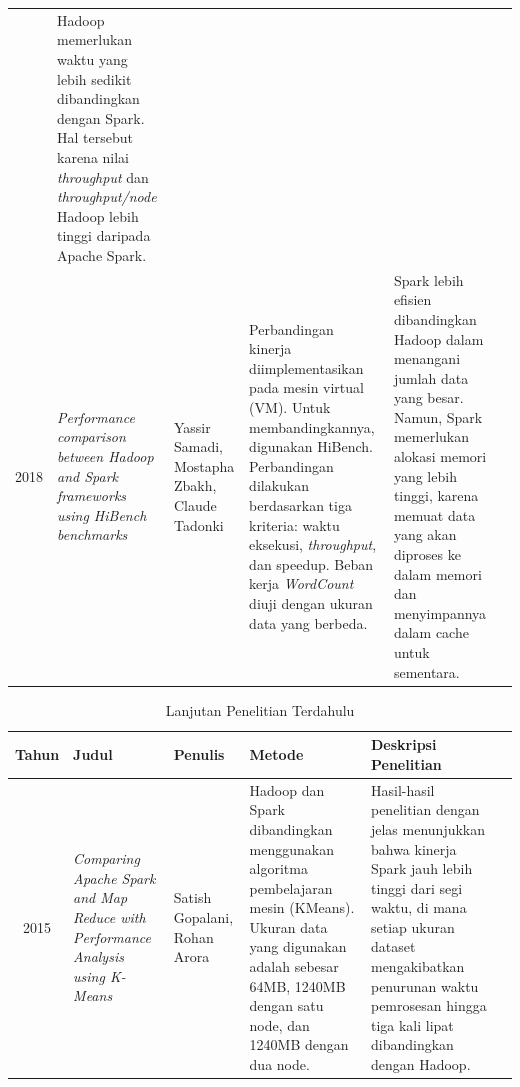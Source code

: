 \begin{table}[h]
\begin{tabularx}{\textwidth}{c*{5}{>{\raggedright\arraybackslash}X}}
  & Hadoop memerlukan waktu yang lebih sedikit dibandingkan dengan Spark. Hal tersebut karena nilai \textit{throughput} dan \textit{throughput/node} Hadoop lebih tinggi daripada Apache Spark. \\
2018 & \textit{Performance comparison between Hadoop and Spark frameworks using HiBench benchmarks \cite{samadiPerformanceComparisonHadoop2018}} 
  & Yassir Samadi, Mostapha Zbakh, Claude Tadonki 
  & Perbandingan kinerja diimplementasikan pada mesin virtual (VM). Untuk membandingkannya, digunakan HiBench. Perbandingan dilakukan berdasarkan tiga kriteria: waktu eksekusi, \textit{throughput}, dan speedup. Beban kerja \textit{WordCount} diuji dengan ukuran data yang berbeda.
  & Spark lebih efisien dibandingkan Hadoop dalam menangani jumlah data yang besar. Namun, Spark memerlukan alokasi memori yang lebih tinggi, karena memuat data yang akan diproses ke dalam memori dan menyimpannya dalam cache untuk sementara. \\
\bottomrule
\end{tabularx}
\end{table}

\begin{table}[ht]
\caption{Lanjutan Penelitian Terdahulu}
\label{table:penelitian-dulu-lanjutan}
\scriptsize
\begin{tabularx}{\textwidth}{c*{5}{>{\raggedright\arraybackslash}X}}
\toprule
\textbf{Tahun} & \textbf{Judul} & \textbf{Penulis} & \textbf{Metode} 
  & \textbf{Deskripsi Penelitian} \\
\midrule
 2015 & \textit{Comparing Apache Spark and Map Reduce with Performance Analysis using K-Means \cite{gopalaniComparingApacheSpark2015}} 
  & Satish Gopalani, Rohan Arora
  & Hadoop dan Spark dibandingkan menggunakan algoritma pembelajaran mesin (KMeans). Ukuran data yang digunakan adalah sebesar 64MB, 1240MB dengan satu node, dan 1240MB dengan dua node.  
  & Hasil-hasil penelitian dengan jelas menunjukkan bahwa kinerja Spark jauh lebih tinggi dari segi waktu, di mana setiap ukuran dataset mengakibatkan penurunan waktu pemrosesan hingga tiga kali lipat dibandingkan dengan Hadoop. \\
\bottomrule
\end{tabularx}
\end{table}



